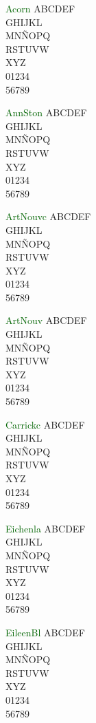 \documentclass[11pt]{article}
\newcommand{\blInitSz}{20}
\begin{document}
\textcolor{darkgreen}{Acorn}
{\blSetAcorn\fontsize{\blInitSz}{40}\selectfont ABCDEF\\ GHIJKL\\ MNÑOPQ\\ RSTUVW\\ XYZ\\ 01234\\ 56789}

\textcolor{darkgreen}{AnnSton}
{\blSetAnnSton\fontsize{\blInitSz}{40}\selectfont ABCDEF\\ GHIJKL\\ MNÑOPQ\\ RSTUVW\\ XYZ\\ 01234\\ 56789}

\textcolor{darkgreen}{ArtNouvc}
{\blSetArtNouvc\fontsize{\blInitSz}{40}\selectfont ABCDEF\\ GHIJKL\\ MNÑOPQ\\ RSTUVW\\ XYZ\\ 01234\\ 56789}

\textcolor{darkgreen}{ArtNouv}
{\blSetArtNouv\fontsize{\blInitSz}{40}\selectfont ABCDEF\\ GHIJKL\\ MNÑOPQ\\ RSTUVW\\ XYZ\\ 01234\\ 56789}

\textcolor{darkgreen}{Carrickc}
{\blSetCarrickc\fontsize{\blInitSz}{40}\selectfont ABCDEF\\ GHIJKL\\ MNÑOPQ\\ RSTUVW\\ XYZ\\ 01234\\ 56789}

\textcolor{darkgreen}{Eichenla}
{\blSetEichenla\fontsize{\blInitSz}{40}\selectfont ABCDEF\\ GHIJKL\\ MNÑOPQ\\ RSTUVW\\ XYZ\\ 01234\\ 56789}

\textcolor{darkgreen}{EileenBl}
{\blSetEileenBl\fontsize{\blInitSz}{40}\selectfont ABCDEF\\ GHIJKL\\ MNÑOPQ\\ RSTUVW\\ XYZ\\ 01234\\ 56789}
\end{document}
